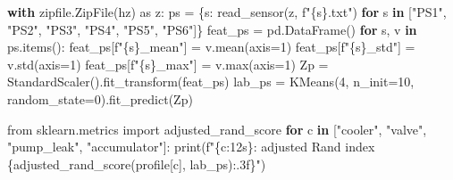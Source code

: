 \documentclass[
  letterpaper,
  DIV=11,
  numbers=noendperiod]{scrreprt}
\newenvironment{Shaded}{\begin{snugshade}}{\end{snugshade}}
\newcommand{\BuiltInTok}[1]{\textcolor[rgb]{0.00,0.23,0.31}{#1}}
\newcommand{\ControlFlowTok}[1]{\textcolor[rgb]{0.00,0.23,0.31}{\textbf{#1}}}
\newcommand{\DecValTok}[1]{\textcolor[rgb]{0.68,0.00,0.00}{#1}}
\newcommand{\ImportTok}[1]{\textcolor[rgb]{0.00,0.46,0.62}{#1}}
\newcommand{\KeywordTok}[1]{\textcolor[rgb]{0.00,0.23,0.31}{\textbf{#1}}}
\newcommand{\NormalTok}[1]{\textcolor[rgb]{0.00,0.23,0.31}{#1}}
\newcommand{\OperatorTok}[1]{\textcolor[rgb]{0.37,0.37,0.37}{#1}}
\newcommand{\SpecialCharTok}[1]{\textcolor[rgb]{0.37,0.37,0.37}{#1}}
\newcommand{\SpecialStringTok}[1]{\textcolor[rgb]{0.13,0.47,0.30}{#1}}
\newcommand{\StringTok}[1]{\textcolor[rgb]{0.13,0.47,0.30}{#1}}
\begin{document}
\begin{tcolorbox}[enhanced jigsaw, left=2mm, title=\textcolor{quarto-callout-caution-color}{\faFire}\hspace{0.5em}{Solution to Exercise 3}, opacityback=0, breakable, rightrule=.15mm, arc=.35mm, toptitle=1mm, colbacktitle=quarto-callout-caution-color!10!white, opacitybacktitle=0.6, coltitle=black, colframe=quarto-callout-caution-color-frame, bottomrule=.15mm, leftrule=.75mm, bottomtitle=1mm, titlerule=0mm, toprule=.15mm, colback=white]

\begin{Shaded}
\begin{Highlighting}[]
\ControlFlowTok{with}\NormalTok{ zipfile.ZipFile(hz) }\ImportTok{as}\NormalTok{ z:}
\NormalTok{    ps }\OperatorTok{=}\NormalTok{ \{s: read\_sensor(z, }\SpecialStringTok{f"}\SpecialCharTok{\{}\NormalTok{s}\SpecialCharTok{\}}\SpecialStringTok{.txt"}\NormalTok{) }\ControlFlowTok{for}\NormalTok{ s }\KeywordTok{in}\NormalTok{ [}\StringTok{"PS1"}\NormalTok{, }\StringTok{"PS2"}\NormalTok{, }\StringTok{"PS3"}\NormalTok{, }\StringTok{"PS4"}\NormalTok{, }\StringTok{"PS5"}\NormalTok{, }\StringTok{"PS6"}\NormalTok{]\}}
\NormalTok{feat\_ps }\OperatorTok{=}\NormalTok{ pd.DataFrame()}
\ControlFlowTok{for}\NormalTok{ s, v }\KeywordTok{in}\NormalTok{ ps.items():}
\NormalTok{    feat\_ps[}\SpecialStringTok{f"}\SpecialCharTok{\{}\NormalTok{s}\SpecialCharTok{\}}\SpecialStringTok{\_mean"}\NormalTok{] }\OperatorTok{=}\NormalTok{ v.mean(axis}\OperatorTok{=}\DecValTok{1}\NormalTok{)}
\NormalTok{    feat\_ps[}\SpecialStringTok{f"}\SpecialCharTok{\{}\NormalTok{s}\SpecialCharTok{\}}\SpecialStringTok{\_std"}\NormalTok{] }\OperatorTok{=}\NormalTok{ v.std(axis}\OperatorTok{=}\DecValTok{1}\NormalTok{)}
\NormalTok{    feat\_ps[}\SpecialStringTok{f"}\SpecialCharTok{\{}\NormalTok{s}\SpecialCharTok{\}}\SpecialStringTok{\_max"}\NormalTok{] }\OperatorTok{=}\NormalTok{ v.}\BuiltInTok{max}\NormalTok{(axis}\OperatorTok{=}\DecValTok{1}\NormalTok{)}
\NormalTok{Zp }\OperatorTok{=}\NormalTok{ StandardScaler().fit\_transform(feat\_ps)}
\NormalTok{lab\_ps }\OperatorTok{=}\NormalTok{ KMeans(}\DecValTok{4}\NormalTok{, n\_init}\OperatorTok{=}\DecValTok{10}\NormalTok{, random\_state}\OperatorTok{=}\DecValTok{0}\NormalTok{).fit\_predict(Zp)}

\ImportTok{from}\NormalTok{ sklearn.metrics }\ImportTok{import}\NormalTok{ adjusted\_rand\_score}
\ControlFlowTok{for}\NormalTok{ c }\KeywordTok{in}\NormalTok{ [}\StringTok{"cooler"}\NormalTok{, }\StringTok{"valve"}\NormalTok{, }\StringTok{"pump\_leak"}\NormalTok{, }\StringTok{"accumulator"}\NormalTok{]:}
    \BuiltInTok{print}\NormalTok{(}\SpecialStringTok{f"}\SpecialCharTok{\{}\NormalTok{c}\SpecialCharTok{:12s\}}\SpecialStringTok{: adjusted Rand index }\SpecialCharTok{\{}\NormalTok{adjusted\_rand\_score(profile[c], lab\_ps)}\SpecialCharTok{:.3f\}}\SpecialStringTok{"}\NormalTok{)}
\end{Highlighting}
\end{Shaded}


\end{tcolorbox}
\end{document}
